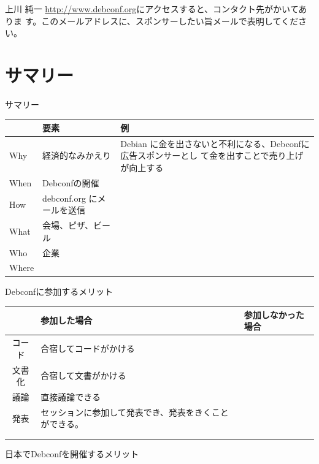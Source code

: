 \documentclass[cjk,dvipdfmx,12pt]{beamer}
\begin{document}
\begin{frame}{上川 純一}
 \url{http://www.debconf.org}にアクセスすると、コンタクト先がかいてありま
す。このメールアドレスに、スポンサーしたい旨メールで表明してください。

\end{frame}


\section{サマリー}

\begin{frame}{サマリー}

\begin{tabularx}{\hsize}{|l|X|X|}
\hline
 & 要素 & 例 \\
\hline
Why & 経済的なみかえり & 
	 Debian に金を出さないと不利になる、Debconfに広告スポンサーとし
	 て金を出すことで売り上げが向上する
	 \\
When & Debconfの開催 & \\
How & debconf.org にメールを送信 & \\
What & 会場、ピザ、ビール
& \\
Who & 企業 & \\
Where &  & \\
\hline
\end{tabularx}
\end{frame}


\begin{frame}{Debconfに参加するメリット}
  \begin{tabularx}{\hsize}{|c|X|X|}
 \hline
 & 参加した場合 & 参加しなかった場合 \\
 \hline
 コード	& 合宿してコードがかける &  \\
 \hline
 文書化	& 合宿して文書がかける&  \\
 \hline
 議論 	& 直接議論できる &  \\
 \hline
 発表 	& セッションに参加して発表でき、発表をきくことができる。 &  \\
 \hline
&&\\
 \hline
&&\\
 \hline
 \end{tabularx}
\end{frame}

\begin{frame}{日本でDebconfを開催するメリット}
 
\end{frame}
\end{document}
